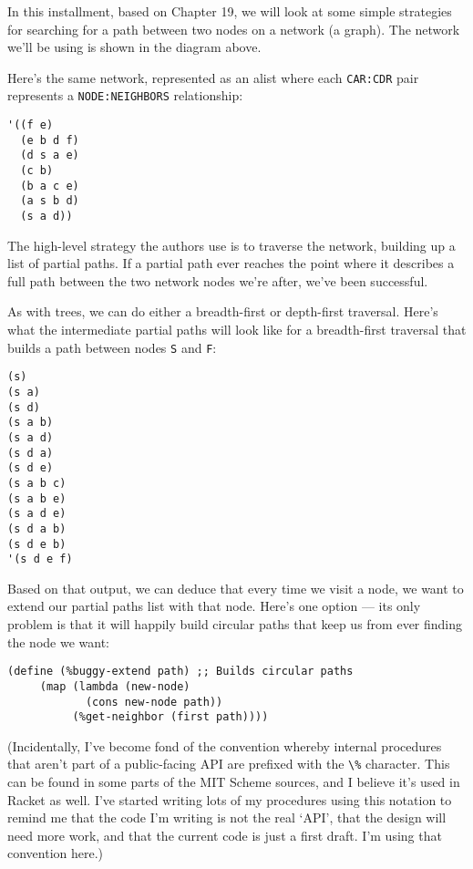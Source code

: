\documentclass[12pt,openright,draft]{book}
\begin{document}
In this installment, based on Chapter 19, we will look at some
simple strategies for searching for a path between two nodes on a
network (a graph).  The network we'll be using is shown in the
diagram above.

Here's the same network, represented as an alist where each
\verb|CAR:CDR| pair represents a \verb|NODE:NEIGHBORS| relationship:

\begin{verbatim}
'((f e)
  (e b d f)
  (d s a e)
  (c b)
  (b a c e)
  (a s b d)
  (s a d))
\end{verbatim}

The high-level strategy the authors use is to traverse the network,
building up a list of partial paths.  If a partial path ever reaches
the point where it describes a full path between the two network nodes
we're after, we've been successful.

As with trees, we can do either a breadth-first or depth-first
traversal.  Here's what the intermediate partial paths will look like
for a breadth-first traversal that builds a path between nodes
\verb|S| and \verb|F|:

\begin{verbatim}
(s)
(s a)
(s d)
(s a b)
(s a d)
(s d a)
(s d e)
(s a b c)
(s a b e)
(s a d e)
(s d a b)
(s d e b)
'(s d e f)
\end{verbatim}

Based on that output, we can deduce that every time we visit a node,
we want to extend our partial paths list with that node.  Here's one
option --- its only problem is that it will happily build circular
paths that keep us from ever finding the node we want:

\begin{verbatim}
(define (%buggy-extend path) ;; Builds circular paths
     (map (lambda (new-node)
            (cons new-node path))
          (%get-neighbor (first path))))
\end{verbatim}

(Incidentally, I've become fond of the convention whereby internal
procedures that aren't part of a public-facing API are prefixed with
the \verb|\%| character.  This can be found in some parts of the MIT
Scheme sources, and I believe it's used in Racket as well.  I've
started writing lots of my procedures using this notation to remind me
that the code I'm writing is not the real `API', that the design will
need more work, and that the current code is just a first draft.  I'm
using that convention here.)
\end{document}
